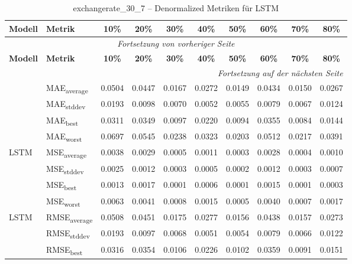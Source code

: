 {\small
\begin{longtable}{l l c c c c c c c c}
    \toprule
    \textbf{Modell} & \textbf{Metrik} & \textbf{10\%} & \textbf{20\%} & \textbf{30\%} & \textbf{40\%} & \textbf{50\%} & \textbf{60\%} & \textbf{70\%} & \textbf{80\%} \\
    \midrule
    \endfirsthead
    \multicolumn{10}{c}{\textit{Fortsetzung von vorheriger Seite}} \\
    \toprule
    \textbf{Modell} & \textbf{Metrik} & \textbf{10\%} & \textbf{20\%} & \textbf{30\%} & \textbf{40\%} & \textbf{50\%} & \textbf{60\%} & \textbf{70\%} & \textbf{80\%} \\
    \midrule
    \endhead
    \midrule
    \multicolumn{10}{r}{\textit{Fortsetzung auf der nächsten Seite}} \\
    \midrule
    \endfoot
    \bottomrule
    \caption{exchangerate_30_7 -- Denormalized Metriken für LSTM}
    \label{tab:exchangerate_30_7_denormalized_lstm}
    \endlastfoot
\multirow{4}{*}{LSTM} & MAE\textsubscript{average} & 0.0504 & 0.0447 & 0.0167 & 0.0272 & 0.0149 & 0.0434 & 0.0150 & 0.0267 \\
 & MAE\textsubscript{stddev} & 0.0193 & 0.0098 & 0.0070 & 0.0052 & 0.0055 & 0.0079 & 0.0067 & 0.0124 \\
 & MAE\textsubscript{best} & 0.0311 & 0.0349 & 0.0097 & 0.0220 & 0.0094 & 0.0355 & 0.0084 & 0.0144 \\
 & MAE\textsubscript{worst} & 0.0697 & 0.0545 & 0.0238 & 0.0323 & 0.0203 & 0.0512 & 0.0217 & 0.0391 \\
\cmidrule(lr){2-10}
\multirow{4}{*}{LSTM} & MSE\textsubscript{average} & 0.0038 & 0.0029 & 0.0005 & 0.0011 & 0.0003 & 0.0028 & 0.0004 & 0.0010 \\
 & MSE\textsubscript{stddev} & 0.0025 & 0.0012 & 0.0003 & 0.0005 & 0.0002 & 0.0012 & 0.0003 & 0.0007 \\
 & MSE\textsubscript{best} & 0.0013 & 0.0017 & 0.0001 & 0.0006 & 0.0001 & 0.0015 & 0.0001 & 0.0003 \\
 & MSE\textsubscript{worst} & 0.0063 & 0.0041 & 0.0008 & 0.0015 & 0.0005 & 0.0040 & 0.0007 & 0.0017 \\
\cmidrule(lr){2-10}
\multirow{4}{*}{LSTM} & RMSE\textsubscript{average} & 0.0508 & 0.0451 & 0.0175 & 0.0277 & 0.0156 & 0.0438 & 0.0157 & 0.0273 \\
 & RMSE\textsubscript{stddev} & 0.0193 & 0.0097 & 0.0068 & 0.0051 & 0.0054 & 0.0079 & 0.0066 & 0.0122 \\
 & RMSE\textsubscript{best} & 0.0316 & 0.0354 & 0.0106 & 0.0226 & 0.0102 & 0.0359 & 0.0091 & 0.0151 \\

\end{longtable}}

